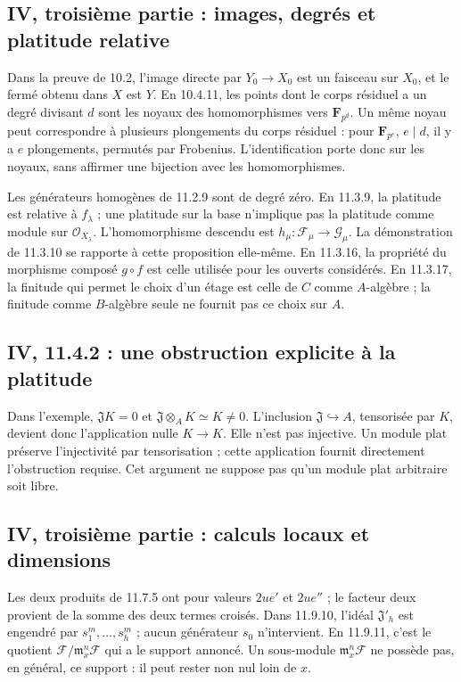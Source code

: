 \subsection{IV, troisième partie : images, degrés et platitude relative}
\label{note:iv3-geometry}
Dans la preuve de 10.2, l'image directe par $Y_0\to X_0$ est un
faisceau sur $X_0$, et le fermé obtenu dans $X$ est $Y$.
En 10.4.11, les points dont le corps résiduel a un degré divisant $d$
sont les noyaux des homomorphismes vers $\mathbf F_{p^d}$. Un même noyau
peut correspondre à plusieurs plongements du corps résiduel : pour
$\mathbf F_{p^e}$, $e\mid d$, il y a $e$ plongements, permutés par
Frobenius. L'identification porte donc sur les noyaux, sans affirmer une
bijection avec les homomorphismes.

Les générateurs homogènes de 11.2.9 sont de degré zéro. En 11.3.9,
la platitude est relative à $f_\lambda$ ; une platitude sur la base
n'implique pas la platitude comme module sur $\mathcal O_{X_\lambda}$.
L'homomorphisme descendu est $h_\mu:\mathcal F_\mu\to\mathcal G_\mu$.
La démonstration de 11.3.10 se rapporte à cette proposition elle-même.
En 11.3.16, la propriété du morphisme composé $g\circ f$ est celle
utilisée pour les ouverts considérés. En 11.3.17, la finitude qui
permet le choix d'un étage est celle de $C$ comme $A$-algèbre ; la
finitude comme $B$-algèbre seule ne fournit pas ce choix sur $A$.

\subsection{IV, 11.4.2 : une obstruction explicite à la platitude}
\label{note:iv3-nonflat}
Dans l'exemple, $\mathfrak J K=0$ et
$\mathfrak J\otimes_A K\simeq K\ne0$.
L'inclusion $\mathfrak J\hookrightarrow A$, tensorisée par $K$, devient
donc l'application nulle $K\to K$. Elle n'est pas injective.
Un module plat préserve l'injectivité par tensorisation ; cette
application fournit directement l'obstruction requise.
Cet argument ne suppose pas qu'un module plat arbitraire soit libre.

\subsection{IV, troisième partie : calculs locaux et dimensions}
\label{note:iv3-modules}
Les deux produits de 11.7.5 ont pour valeurs $2ue'$ et $2ue''$ ; le
facteur deux provient de la somme des deux termes croisés.
Dans 11.9.10, l'idéal $\mathfrak J'_h$ est engendré par
$s_1^m,\ldots,s_h^m$ ; aucun générateur $s_0$ n'intervient.
En 11.9.11, c'est le quotient
$\mathcal F/\mathfrak m_x^n\mathcal F$ qui a le support annoncé.
Un sous-module $\mathfrak m_x^n\mathcal F$ ne possède pas, en général,
ce support : il peut rester non nul loin de $x$.

